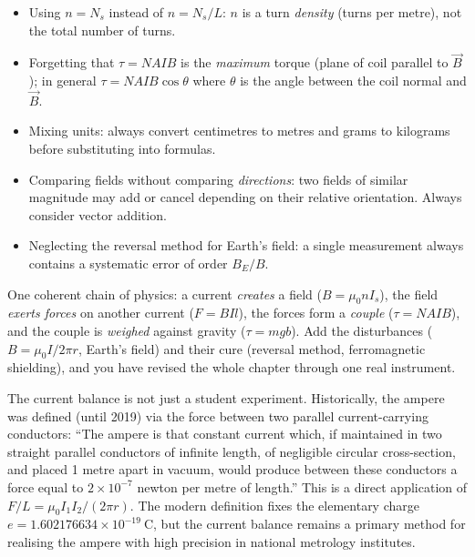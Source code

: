 \documentclass[11pt]{article}
\newcommand{\cle}[1]{{\popxbold\color{popdark}#1}}
\begin{document}
\begin{attention}
\begin{itemize}
\item Using $n = N_s$ instead of $n = N_s/L$: $n$ is a turn \emph{density} (turns per metre), not the total number of turns.
\item Forgetting that $\tau = NAIB$ is the \emph{maximum} torque (plane of coil parallel to $\vec{B}$); in general $\tau = NAIB\cos\theta$ where $\theta$ is the angle between the coil normal and $\vec{B}$.
\item Mixing units: always convert centimetres to metres and grams to kilograms before substituting into formulas.
\item Comparing fields without comparing \emph{directions}: two fields of similar magnitude may add or cancel depending on their relative orientation. Always consider vector addition.
\item Neglecting the reversal method for Earth's field: a single measurement always contains a systematic error of order $B_E/B$.
\end{itemize}
\end{attention}

\begin{aretenir}
One coherent chain of physics: a current \emph{creates} a field ($B=\mu_0 n I_s$), the field \emph{exerts forces} on another current ($F = BIl$), the forces form a \emph{couple} ($\tau = NAIB$), and the couple is \emph{weighed} against gravity ($\tau = mgb$). Add the disturbances ($B = \mu_0 I/2\pi r$, Earth's field) and their cure (reversal method, ferromagnetic shielding), and you have revised the whole chapter through one real instrument.
\end{aretenir}

\begin{savaistu}
The current balance is not just a student experiment. Historically, the \cle{ampere} was defined (until 2019) via the force between two parallel current-carrying conductors: ``The ampere is that constant current which, if maintained in two straight parallel conductors of infinite length, of negligible circular cross-section, and placed 1 metre apart in vacuum, would produce between these conductors a force equal to $2 \times 10^{-7}$ newton per metre of length.'' This is a direct application of $F/L = \mu_0 I_1 I_2 / (2\pi r)$. The modern definition fixes the elementary charge $e = 1.602176634 \times 10^{-19}\ \mathrm{C}$, but the current balance remains a primary method for realising the ampere with high precision in national metrology institutes.
\end{savaistu}
\end{document}

